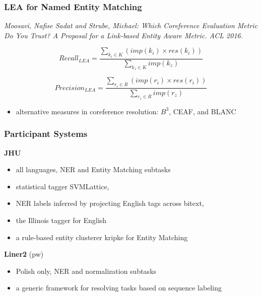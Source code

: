 \documentclass{beamer}
\begin{document}
\begin{frame}
 \frametitle{LEA for Named Entity Matching}

\textit{Moosavi, Nafise Sadat  and  Strube, Michael: Which Coreference Evaluation Metric Do You Trust? A Proposal for a Link-based Entity Aware Metric. ACL 2016.}

\begin{equation*}
	\mathit{\mathit{Recall}_{LEA}} = \frac{\sum_{k_{i} \in K} (\mathit{imp}(k_i) \times \mathit{res}(k_{i}))}
              {\sum_{k_{z} \in K} imp(k_{z})}
\end{equation*}

\begin{equation*}
	\mathit{\mathit{Precision}_{LEA}} = \frac{\sum_{r_{i} \in R} (\mathit{imp}(r_i) \times \mathit{res}(r_{i}))}
              {\sum_{r_{z} \in R} imp(r_{z})}
\end{equation*}

\begin{itemize}
\item alternative measures in coreference resolution: $B^3$, CEAF, and BLANC
\end{itemize}

\end{frame}

\begin{frame}
 \frametitle{Participant Systems}

\textbf{JHU}
\begin{itemize}
\item all languages, NER and Entity Matching subtasks
\item statistical tagger SVMLattice, 
\item NER labels inferred by projecting English tags across bitext,
\item the Illinois tagger for English
\item a rule-based entity clusterer kripke for Entity Matching
\end{itemize}

\textbf{Liner2} (pw)
\begin{itemize}
\item Polish only, NER and normalization subtasks
\item a generic framework for resolving tasks based on sequence labeling
\end{itemize}

\end{frame}
\end{document}
